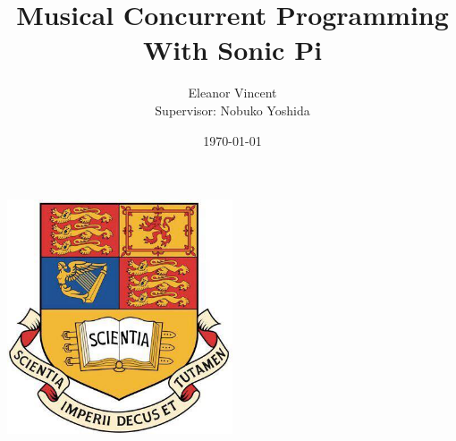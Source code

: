 \documentclass[11pt, abstracton, twoside, titlepage=true]{scrartcl}
\begin{document}
\subject{{\large Department of Computing \\ Imperial College London} \\
\LARGE{Individual MEng Project}}
\title{Musical Concurrent Programming \\ With Sonic Pi}
\author{{\LARGE Eleanor Vincent} \\ {\large Supervisor: Nobuko Yoshida}}
\date{\today} 

\maketitle{\thispagestyle{empty}}

\begin{center} 
	\includegraphics[width=0.50\textwidth]{images/crest.jpg}
\end{center}

\afterpage{\thispagestyle{empty}\null\newpage}
\newpage
\end{document}
